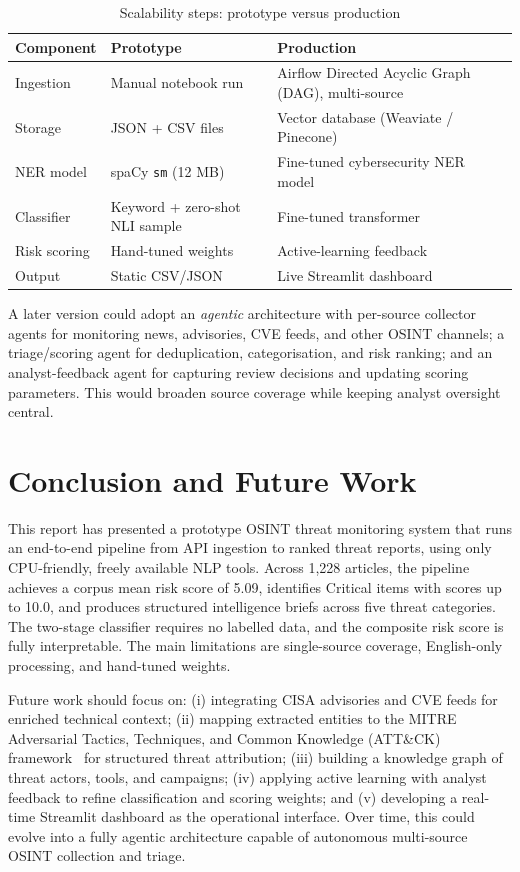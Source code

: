 \documentclass[12pt,lettersize,journal,onecolumn]{IEEEtran}
\begin{document}
\begin{table}[ht]
\centering
\small
\caption{Scalability steps: prototype versus production}
\label{tab:scalability}
\begin{tabular}{@{}lll@{}}
\toprule
\textbf{Component} & \textbf{Prototype} & \textbf{Production} \\
\midrule
Ingestion     & Manual notebook run      & Airflow Directed Acyclic Graph (DAG), multi-source \\
Storage       & JSON + CSV files         & Vector database (Weaviate / Pinecone) \\
NER model     & spaCy \texttt{sm} (12 MB) & Fine-tuned cybersecurity NER model \\
Classifier    & Keyword + zero-shot NLI sample & Fine-tuned transformer \\
Risk scoring  & Hand-tuned weights       & Active-learning feedback \\
Output        & Static CSV/JSON          & Live Streamlit dashboard \\
\bottomrule
\end{tabular}
\end{table}

A later version could adopt an \textit{agentic} architecture with per-source collector agents for monitoring news, advisories, CVE feeds, and other OSINT channels; a triage/scoring agent for deduplication, categorisation, and risk ranking; and an analyst-feedback agent for capturing review decisions and updating scoring parameters. This would broaden source coverage while keeping analyst oversight central.

% 
\section{Conclusion and Future Work}
\label{sec:conclusion}
% 

This report has presented a prototype OSINT threat monitoring system that runs an end-to-end pipeline from API ingestion to ranked threat reports, using only CPU-friendly, freely available NLP tools. Across 1,228 articles, the pipeline achieves a corpus mean risk score of 5.09, identifies Critical items with scores up to 10.0, and produces structured intelligence briefs across five threat categories. The two-stage classifier requires no labelled data, and the composite risk score is fully interpretable. The main limitations are single-source coverage, English-only processing, and hand-tuned weights.

Future work should focus on: (i) integrating CISA advisories and CVE feeds for enriched technical context; (ii) mapping extracted entities to the MITRE Adversarial Tactics, Techniques, and Common Knowledge (ATT\&CK) framework~\cite{strom2018mitre} for structured threat attribution; (iii) building a knowledge graph of threat actors, tools, and campaigns; (iv) applying active learning with analyst feedback to refine classification and scoring weights; and (v) developing a real-time Streamlit dashboard as the operational interface. Over time, this could evolve into a fully agentic architecture capable of autonomous multi-source OSINT collection and triage.

% 


% 
\end{document}
